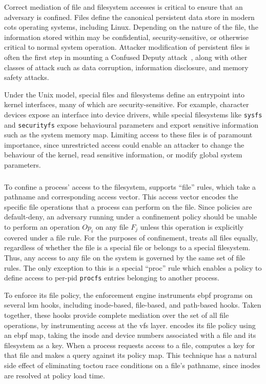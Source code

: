 Correct mediation of file and filesystem accesses is critical to ensure that an adversary
is confined. Files define the canonical persistent data store in modern \gls{cots}
operating systems, including Linux. Depending on the nature of the file, the information
stored within may be confidential, security-sensitive, or otherwise critical to normal
system operation. Attacker modification of persistent files is often the first step in
mounting a Confused Deputy attack~\cite{hardy1988_confused_deputy}, along with other
classes of attack such as data corruption, information disclosure, and memory safety
attacks.

Under the Unix model, special files and filesystems define an entrypoint into kernel
interfaces, many of which are security-sensitive. For example, character devices expose an
interface into device drivers, while special filesystems like \texttt{sysfs} and
\texttt{securityfs} expose behavioural parameters and export sensitive information such as
the system memory map. Limiting access to these files is of paramount importance, since
unrestricted access could enable an attacker to change the behaviour of the kernel, read
sensitive information, or modify global system parameters.

\subsubsection{\bpfbox{}}

To confine a process' access to the filesystem, \bpfbox{} supports \enquote{file} rules,
which take a pathname and corresponding access vector. This access vector encodes the
specific file operations that a process can perform on the file. Since \bpfbox{} policies
are default-deny, an adversary running under a \bpfbox{} confinement policy should be
unable to perform an operation $Op_i$ on any file $F_j$ unless this operation is
explicitly covered under a file rule. For the purposes of confinement, \bpfbox{} treats
all files equally, regardless of whether the file is a special file or belongs to
a special filesystem. Thus, any access to any file on the system is governed by the same
set of file rules. The only exception to this is a special \enquote{proc} rule which
enables a policy to define access to per-pid \texttt{procfs} entries belonging to another
process.

To enforce its file policy, the \bpfbox{} enforcement engine instruments \gls{ebpf}
programs on several \gls{lsm} hooks, including inode-based, file-based, and path-based
hooks. Taken together, these hooks provide complete mediation over the set of all file
operations, by instrumenting access at the \gls{vfs} layer. \bpfbox{} encodes its file
policy using an \gls{ebpf} map, taking the inode and device numbers associated with a file
and its filesystem as a key. When a process requests access to a file, \bpfbox{} computes
a key for that file and makes a query against its policy map. This technique has a natural
side effect of eliminating \gls{toctou} race conditions on a file's pathname, since inodes
are resolved at policy load time.

